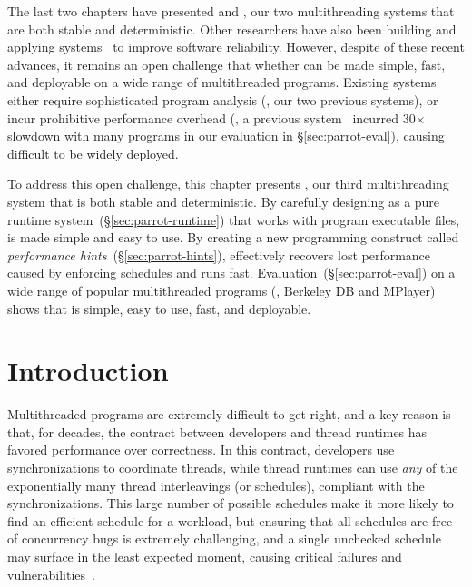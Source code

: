 The last two chapters have presented \tern and \peregrine, our two 
multithreading systems that are both stable and deterministic. Other 
researchers have also been building and applying \smt 
systems~\cite{determinator:osdi10, dthreads:sosp11, bergan:oopsla13} to improve 
software reliability. However, despite of these recent advances, it remains an 
open challenge that whether \smt can be made simple, fast, and deployable on a 
wide range of multithreaded programs. Existing systems either require 
sophisticated program analysis (\eg, our two previous systems), or incur 
prohibitive performance overhead (\eg, a previous system~\cite{dthreads:sosp11} 
incurred 30$\times$ slowdown with many programs in our evaluation in 
\S\ref{sec:parrot-eval}), causing \smt difficult to be widely deployed.

To address this open challenge, this chapter presents \parrot, our third multithreading 
system that is both stable and deterministic. By carefully designing 
\parrot as a pure runtime system~(\S\ref{sec:parrot-runtime}) that works with 
program executable files, \smt is made simple and easy to use. By creating a 
new programming construct called \emph{performance 
hints}~(\S\ref{sec:parrot-hints}), \parrot effectively recovers lost 
performance caused by enforcing \smt schedules and runs fast. 
Evaluation~(\S\ref{sec:parrot-eval}) on a wide range of \nprog popular 
multithreaded programs (\eg, Berkeley DB and MPlayer) shows that \parrot is 
simple, easy to use, fast, and deployable.

\section{Introduction} \label{sec:parrot-intro}

Multithreaded programs are extremely difficult to get right, and a key reason 
is that, for decades, the contract between developers and thread runtimes has 
favored performance over correctness.  In this contract, developers use 
synchronizations to coordinate threads, while thread runtimes can
use \emph{any} of the exponentially many thread interleavings (or schedules), 
compliant with the synchronizations.  This large number of possible schedules 
make it more likely to find an efficient schedule for a workload, but ensuring
that all schedules are free of concurrency bugs is extremely challenging, and a 
single unchecked schedule may surface in the least expected moment, causing 
critical failures and vulnerabilities~\cite{therac25-investigation, 
northeast-blackout, lu:concurrency-bugs,con:hotpar12}.

